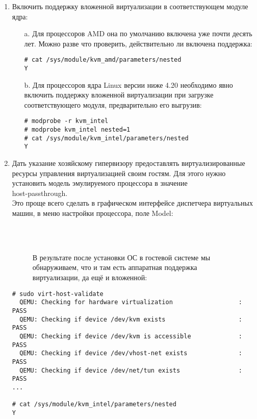 \documentclass[14pt, a4paper]{article}
\begin{document}
\begin{enumerate}
    \item Включить поддержку вложенной виртуализации в соответствующем модуле ядра:
    \begin{enumerate}
        \item[a.] Для процессоров AMD она по умолчанию включена уже почти десять лет. Можно разве
        что проверить, действительно ли включена поддержка:
        \begin{lstlisting}
# cat /sys/module/kvm_amd/parameters/nested
Y
        \end{lstlisting}
        \item[b.] Для процессоров ядра Linux версии ниже 4.20 необходимо явно включить поддержку
        вложенной виртуализации при загрузке соответствующего модуля, предварительно его
        выгрузив:
        \begin{lstlisting}
# modprobe -r kvm_intel
# modprobe kvm_intel nested=1
# cat /sys/module/kvm_intel/parameters/nested
Y
        \end{lstlisting}   
    \end{enumerate}

    \item Дать указание хозяйскому гипервизору предоставлять виртуализированные ресурсы
    управления виртуализацией своим гостям. Для этого нужно установить модель эмулируемого
    процессора в значение \\
    \colorbox{backcolour}{host-passthrough}.\\
    Это проще всего сделать в графическом интерфейсе диспетчера виртуальных машин, в меню
    настройки процессора, поле Model:
    \begin{figure}[h]
        \begin{centering}
        \\  \mbox{}\\
        \label{framework} 
        \end{centering}
        В результате после установки ОС в гостевой системе мы обнаруживаем, что и там есть аппаратная
поддержка виртуализации, да ещё и вложенной:
    \end{figure}
    
    \begin{lstlisting}
# sudo virt-host-validate
  QEMU: Checking for hardware virtualization                  : PASS
  QEMU: Checking if device /dev/kvm exists                    : PASS
  QEMU: Checking if device /dev/kvm is accessible             : PASS
  QEMU: Checking if device /dev/vhost-net exists              : PASS
  QEMU: Checking if device /dev/net/tun exists                : PASS
...

# cat /sys/module/kvm_intel/parameters/nested
Y
    \end{lstlisting}
\end{enumerate}
\end{document}
